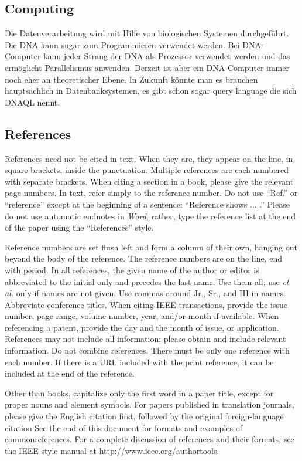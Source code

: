 \documentclass{IEEEcsmag}
\begin{document}
\subsection{Computing}
Die Datenverarbeitung wird mit Hilfe von biologischen Systemen durchgeführt.  Die DNA kann sugar zum Programmieren verwendet werden. Bei DNA-Computer kann jeder Strang der DNA als Prozessor verwendet werden und das ermöglicht Parallelismus anwenden. Derzeit ist aber ein DNA-Computer immer noch eher an theoretischer Ebene. In Zukunft könnte man es brauchen hauptsächlich in Datenbanksystemen, es gibt schon sogar query language die sich DNAQL nennt.




\subsection{References}


References need not be cited in text. When they are, they appear on the 
line, in square brackets, inside the punctuation. Multiple references are 
each numbered with separate brackets. When citing a section in a book, 
please give the relevant page numbers. In text, refer simply to the 
reference number. Do not use ``Ref.'' or ``reference'' except at the 
beginning of a sentence: ``Reference \cite{CC1} shows $\ldots$ .'' Please do not use 
automatic endnotes in \emph{Word}, rather, type the reference list at the end of the 
paper using the ``References'' style.

Reference numbers are set flush left and form a column of their own, hanging 
out beyond the body of the reference. The reference numbers are on the line, 
end with period. In all references, the given name of the author 
or editor is abbreviated to the initial only and precedes the last name. Use 
them all; use \emph{et al.} only if names are not given. Use commas around Jr., 
Sr., and III in names. Abbreviate conference titles. When citing IEEE 
transactions, provide the issue number, page range, volume number, year, 
and/or month if available. When referencing a patent, provide the day and 
the month of issue, or application. References may not include all 
information; please obtain and include relevant information. Do not combine 
references. There must be only one reference with each number. If there is a 
URL included with the print reference, it can be included at the end of the 
reference. 

Other than books, capitalize only the first word in a paper title, except 
for proper nouns and element symbols. For papers published in translation 
journals, please give the English citation first, followed by the original 
foreign-language citation See the end of this document for formats and 
examples of common\break references. For a complete discussion of references and 
their formats, see the IEEE style manual at
\url{http://www.ieee.org/authortools}.
\end{document}
